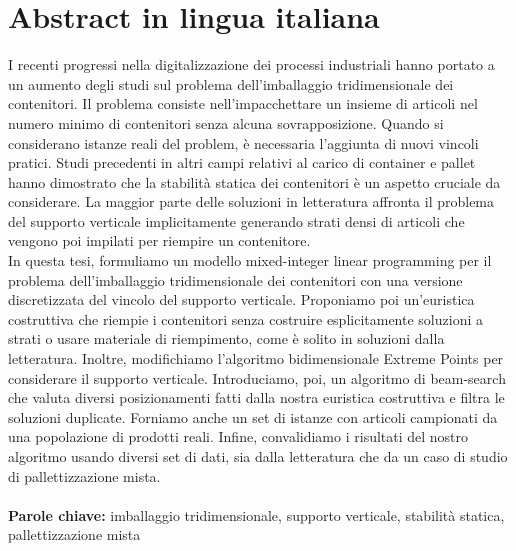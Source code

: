 
\chapter*{Abstract in lingua italiana}
I recenti progressi nella digitalizzazione dei processi industriali hanno portato a un aumento degli studi sul problema dell'imballaggio tridimensionale dei contenitori.
Il problema consiste nell'impacchettare un insieme di articoli nel numero minimo di contenitori senza alcuna sovrapposizione.
Quando si considerano istanze reali del problem, è necessaria l'aggiunta di nuovi vincoli pratici.
Studi precedenti in altri campi relativi al carico di container e pallet hanno dimostrato che la stabilità statica dei contenitori è un aspetto cruciale da considerare.
La maggior parte delle soluzioni in letteratura affronta il problema del supporto verticale implicitamente generando strati densi di articoli che vengono poi impilati per riempire un contenitore.
\\
In questa tesi, formuliamo un modello mixed-integer linear programming per il problema dell'imballaggio tridimensionale dei contenitori con una versione discretizzata del vincolo del supporto verticale.
Proponiamo poi un'euristica costruttiva che riempie i contenitori senza costruire esplicitamente soluzioni a strati o usare materiale di riempimento, come è solito in soluzioni dalla letteratura.
Inoltre, modifichiamo l'algoritmo bidimensionale Extreme Points per considerare il supporto verticale.
Introduciamo, poi, un algoritmo di beam-search che valuta diversi posizionamenti fatti dalla nostra euristica costruttiva e filtra le soluzioni duplicate.
Forniamo anche un set di istanze con articoli campionati da una popolazione di prodotti reali.
Infine, convalidiamo i risultati del nostro algoritmo usando diversi set di dati, sia dalla letteratura che da un caso di studio di pallettizzazione mista.
\\
\\
\textbf{Parole chiave:} imballaggio tridimensionale, supporto verticale, stabilità statica, pallettizzazione mista %